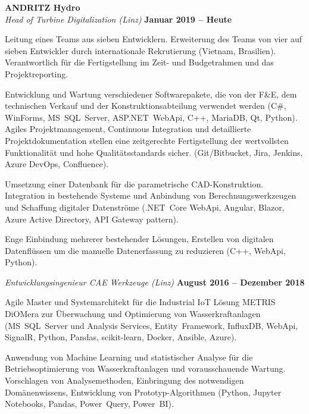 \documentclass[line,11pt,a4paper]{resume}
\begin{document}
\begin{resume}
\textbf{ANDRITZ Hydro}\\\vspace{1mm}%
\textsl{Head of Turbine Digitalization (Linz)}
  \hfill \textbf{Januar 2019 -- Heute}\\
\vspace{-4mm}%
\begin{list2}
  \item Leitung eines Teams aus sieben Entwicklern. Erweiterung des Teams von
    vier auf sieben Entwickler durch internationale Rekrutierung (Vietnam,
    Brasilien). Verantwortlich für die Fertigstellung im Zeit- und Budgetrahmen
    und das Projektreporting.
  \item Entwicklung und Wartung verschiedener Softwarepakete, die von der F\&E,
    dem technischen Verkauf und der Konstruktionsabteilung verwendet werden
    (C\#, WinForms, MS~SQL~Server, ASP.NET~WebApi, C++, MariaDB, Qt, Python).
    Agiles Projektmanagement, Continuous Integration und detaillierte
    Projektdokumentation stellen eine zeitgerechte Fertigstellung der
    wertvollsten Funktionalität und hohe Qualitätsstandards sicher.
    (Git/Bitbucket, Jira, Jenkins, Azure DevOps, Confluence).
  \item Umsetzung einer Datenbank für die parametrische CAD-Konstruktion.
    Integration in bestehende Systeme und Anbindung von Berechnungswerkzeugen
    und Schaffung digitaler Datenströme (.NET~Core WebApi, Angular, Blazor,
    Azure Active Directory, API Gateway pattern).
  \item Enge Einbindung mehrerer bestehender Lösungen, Erstellen von digitalen
    Datenflüssen um die manuelle Datenerfassung zu reduzieren (C++, WebApi,
    Python).
\end{list2}

\textsl{Entwicklungsingenieur CAE Werkzeuge (Linz)}
  \hfill \textbf{August 2016 -- Dezember 2018}\\
\vspace{-4mm}%
\begin{list2}
  \item Agile Master und Systemarchitekt für die Industrial IoT Lösung METRIS
    DiOMera zur Überwachung und Optimierung von Wasserkraftanlagen
    (MS~SQL~Server und Analysis Services, Entity~Framework, InfluxDB, WebApi,
    SignalR, Python, Pandas, scikit-learn, Docker, Ansible, Azure).

  \item Anwendung von Machine Learning und statistischer Analyse für die
    Betriebsoptimierung von Wasserkraftanlagen und vorausschauende Wartung.
    Vorschlagen von Analysemethoden, Einbringung des notwendigen
    Domänenwissens, Entwicklung von Prototyp-Algorithmen (Python, Jupyter
    Notebooks, Pandas, Power~Query, Power~BI).
\end{list2}


\end{resume}
\end{document}
